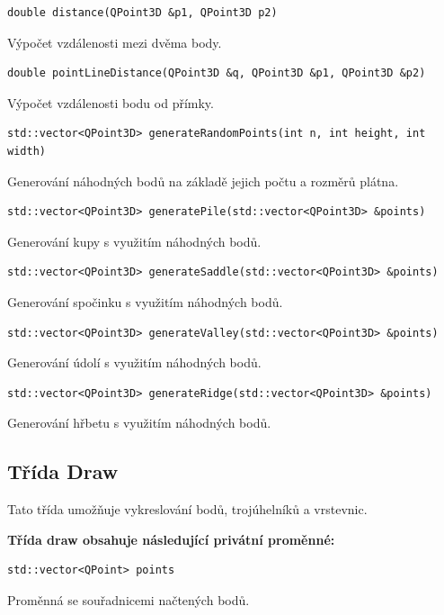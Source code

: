 \documentclass[a4paper, 12pt, oneside, titlepage]{article} %
\begin{document}
\begin{verbatim}
double distance(QPoint3D &p1, QPoint3D p2)
\end{verbatim}
Výpočet vzdálenosti mezi dvěma body.\\

\begin{verbatim}
double pointLineDistance(QPoint3D &q, QPoint3D &p1, QPoint3D &p2)
\end{verbatim}
Výpočet vzdálenosti bodu od přímky.\\

\begin{verbatim}
std::vector<QPoint3D> generateRandomPoints(int n, int height, int width)
\end{verbatim}
Generování náhodných bodů na základě jejich počtu a rozměrů plátna.\\

\begin{verbatim}
std::vector<QPoint3D> generatePile(std::vector<QPoint3D> &points)
\end{verbatim}
Generování kupy s využitím náhodných bodů.\\

\begin{verbatim}
std::vector<QPoint3D> generateSaddle(std::vector<QPoint3D> &points)
\end{verbatim}
Generování spočinku s využitím náhodných bodů.\\

\begin{verbatim}
std::vector<QPoint3D> generateValley(std::vector<QPoint3D> &points)
\end{verbatim}
Generování údolí s využitím náhodných bodů.\\

\begin{verbatim}
std::vector<QPoint3D> generateRidge(std::vector<QPoint3D> &points)
\end{verbatim}
Generování hřbetu s využitím náhodných bodů.\\

    
    
\subsection{Třída Draw}
Tato třída umožňuje vykreslování bodů, trojúhelníků a vrstevnic.

\textbf{Třída draw obsahuje následující privátní proměnné:}
\begin{verbatim}
std::vector<QPoint> points
\end{verbatim}
Proměnná se souřadnicemi načtených bodů.\\
\end{document}
